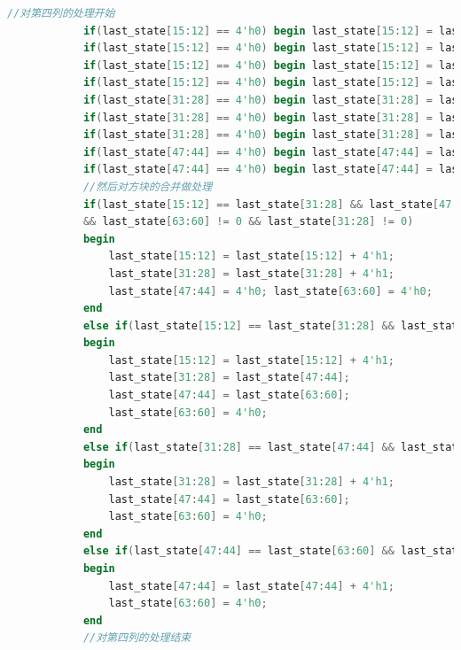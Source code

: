 \documentclass[UTF8]{article}
\begin{document}
\begin{lstlisting}[language=Verilog]
			//对第四列的处理开始
			if(last_state[15:12] == 4'h0) begin last_state[15:12] = last_state[31:28]; last_state[31:28] = last_state[47:44]; last_state[47:44] = last_state[63:60]; last_state[63:60] = 0; end
			if(last_state[15:12] == 4'h0) begin last_state[15:12] = last_state[31:28]; last_state[31:28] = last_state[47:44]; last_state[47:44] = last_state[63:60]; last_state[63:60] = 0; end
			if(last_state[15:12] == 4'h0) begin last_state[15:12] = last_state[31:28]; last_state[31:28] = last_state[47:44]; last_state[47:44] = last_state[63:60]; last_state[63:60] = 0; end
			if(last_state[15:12] == 4'h0) begin last_state[15:12] = last_state[31:28]; last_state[31:28] = last_state[47:44]; last_state[47:44] = last_state[63:60]; last_state[63:60] = 0; end
			if(last_state[31:28] == 4'h0) begin last_state[31:28] = last_state[47:44]; last_state[47:44] = last_state[63:60]; last_state[63:60] = 0; end
			if(last_state[31:28] == 4'h0) begin last_state[31:28] = last_state[47:44]; last_state[47:44] = last_state[63:60]; last_state[63:60] = 0; end
			if(last_state[31:28] == 4'h0) begin last_state[31:28] = last_state[47:44]; last_state[47:44] = last_state[63:60]; last_state[63:60] = 0; end
			if(last_state[47:44] == 4'h0) begin last_state[47:44] = last_state[63:60]; last_state[63:60] = 0; end
			if(last_state[47:44] == 4'h0) begin last_state[47:44] = last_state[63:60]; last_state[63:60] = 0; end
			//然后对方块的合并做处理
			if(last_state[15:12] == last_state[31:28] && last_state[47:44] == last_state[63:60]
			&& last_state[63:60] != 0 && last_state[31:28] != 0)
			begin
				last_state[15:12] = last_state[15:12] + 4'h1;
				last_state[31:28] = last_state[31:28] + 4'h1;
				last_state[47:44] = 4'h0; last_state[63:60] = 4'h0;
			end
			else if(last_state[15:12] == last_state[31:28] && last_state[31:28] != 0)
			begin
				last_state[15:12] = last_state[15:12] + 4'h1;
				last_state[31:28] = last_state[47:44];
				last_state[47:44] = last_state[63:60]; 
				last_state[63:60] = 4'h0;
			end
			else if(last_state[31:28] == last_state[47:44] && last_state[31:28] != 0)
			begin
				last_state[31:28] = last_state[31:28] + 4'h1;
				last_state[47:44] = last_state[63:60];
				last_state[63:60] = 4'h0;
			end
			else if(last_state[47:44] == last_state[63:60] && last_state[63:60] != 0)
			begin
				last_state[47:44] = last_state[47:44] + 4'h1; 
				last_state[63:60] = 4'h0;
			end
			//对第四列的处理结束
			

\end{lstlisting}
\end{document}
